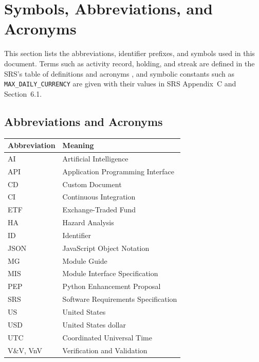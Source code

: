 \documentclass[12pt, titlepage]{article}
\begin{document}
\section{Symbols, Abbreviations, and Acronyms}

This section lists the abbreviations, identifier prefixes, and symbols used in
this document. Terms such as activity record, holding, and streak are defined
in the SRS's table of definitions and acronyms \citep{SRS}, and symbolic
constants such as \texttt{MAX\_DAILY\_CURRENCY} are given with their values in
SRS Appendix~C and Section~6.1.

\renewcommand{\arraystretch}{1.2}

\bigskip
\noindent\begin{minipage}{\textwidth}
\subsection*{Abbreviations and Acronyms}

\smallskip
\begin{tabularx}{\textwidth}{l X}
  \toprule
  \textbf{Abbreviation} & \textbf{Meaning}\\
  \midrule
  AI & Artificial Intelligence\\
  API & Application Programming Interface\\
  CD & Custom Document\\
  CI & Continuous Integration\\
  ETF & Exchange-Traded Fund\\
  HA & Hazard Analysis\\
  ID & Identifier\\
  JSON & JavaScript Object Notation\\
  MG & Module Guide\\
  MIS & Module Interface Specification\\
  PEP & Python Enhancement Proposal\\
  SRS & Software Requirements Specification\\
  US & United States\\
  USD & United States dollar\\
  UTC & Coordinated Universal Time\\
  V\&V, VnV & Verification and Validation\\
  \bottomrule
\end{tabularx}
\end{minipage}
\end{document}
